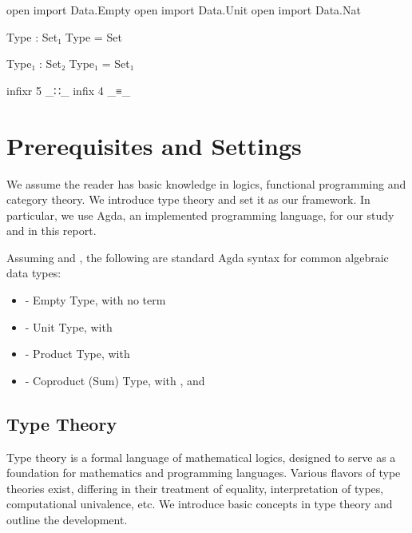 \begin{code}[hide]
open import Data.Empty
open import Data.Unit
open import Data.Nat

Type : Set₁
Type = Set

Type₁ : Set₂
Type₁ = Set₁

infixr 5 _∷_
infix  4 _≡_
\end{code}

\chapter{Prerequisites and Settings}

We assume the reader has basic knowledge in logics, functional programming and category theory. We introduce type theory and set it as our framework. In particular, we use Agda, an implemented programming language, for our study and in this report.

Assuming  \AgdaSymbol{:}  and  \AgdaSymbol{:} , the following are standard Agda syntax for common algebraic data types:

\begin{itemize}
  \item{ - Empty Type, with no term}
  \item{ - Unit Type, with  \AgdaSymbol{:} }
  \item{ - Product Type, with  \AgdaInductiveConstructor{,}  \AgdaSymbol{:}   }
  \item{ - Coproduct (Sum) Type, with   \AgdaSymbol{:}   , and   \AgdaSymbol{:}   }
\end{itemize}

\section{Type Theory}

Type theory is a formal language of mathematical logics, designed to serve as a foundation for mathematics and programming languages. Various flavors of type theories exist, differing in their treatment of equality, interpretation of types, computational univalence, etc. We introduce basic concepts in type theory and outline the development.

